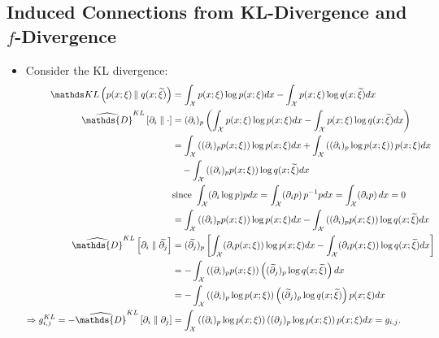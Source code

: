 \documentclass[11pt]{article}
\begin{document}
\subsection{Induced Connections from KL-Divergence and $f$-Divergence}
\begin{itemize}
\item \begin{example}
Consider the KL divergence:
\begin{align*}
\kl{p(x; \xi)}{q(x; \widetilde{\xi})} &= \int_{\cX}p(x; \xi) \log p(x; \xi)  dx - \int_{\cX}p(x; \xi) \log q(x; \widetilde{\xi})  dx  \\
\widehat{\mathds{D}}^{KL}\left[ \partial_i \;\|\;  \cdot \right]  &= (\partial_i)_{p}\paren{\int_{\cX}p(x; \xi) \log p(x; \xi)  dx - \int_{\cX}p(x; \xi) \log q(x; \widetilde{\xi})  dx} \\
&= \int_{\cX} \paren{(\partial_i)_{p} p(x; \xi)} \log p(x; \xi)  dx + \int_{\cX} \paren{(\partial_i)_{p} \log p(x; \xi)} p(x; \xi)   dx \\
& \quad  - \int_{\cX} \paren{(\partial_i)_{p} p(x; \xi)} \log q(x; \widetilde{\xi})  dx \\
&\text{since }\int_{\cX}  (\partial_i \log p) p dx = \int_{\cX} (\partial_i p)\, p^{-1} p dx = \int_{\cX} (\partial_i p)\,  dx  = 0\\
&= \int_{\cX} \paren{(\partial_i)_{p} p(x; \xi)} \log p(x; \xi)  dx -  \int_{\cX} \paren{(\partial_i)_{p} p(x; \xi)} \log q(x; \widetilde{\xi})  dx \\
\widehat{\mathds{D}}^{KL}\left[ \partial_i \;\|\;  \widetilde{\partial_j} \right]  &= ( \widetilde{\partial_j})_p\brac{\int_{\cX} (\partial_i p(x; \xi)) \log p(x; \xi)  dx -  \int_{\cX} (\partial_i p(x; \xi))  \log q(x; \widetilde{\xi})  dx} \\
&= -\int_{\cX} \paren{(\partial_i)_p p(x; \xi)}  \paren{(\widetilde{\partial}_j)_p\log q(x; \widetilde{\xi})}  dx \\
&= -\int_{\cX} \paren{(\partial_i)_p \log p(x; \xi)}  \paren{(\widetilde{\partial}_j)_p\log q(x; \widetilde{\xi})}  p(x; \xi) dx \\
\Rightarrow  g_{i,j}^{KL} = -\widehat{\mathds{D}}^{KL}\left[ \partial_i \;\|\;  \partial_j \right]&=  \int_{\cX} \paren{(\partial_i)_p \log p(x; \xi)}  \paren{({\partial}_j)_p\log p(x; {\xi})}  p(x; \xi) dx = g_{i,j}.
\end{align*}
\end{example}


\end{itemize}
\end{document}
